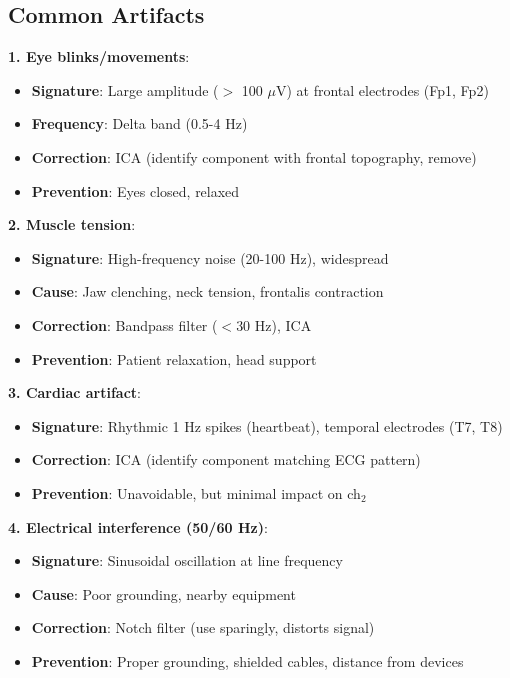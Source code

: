 \subsection{Common Artifacts}

\begin{theorem}\label{thm:artifacts}
\textbf{1. Eye blinks/movements}:
\begin{itemize}
\item \textbf{Signature}: Large amplitude ($>$ 100 $\mu$V) at frontal electrodes (Fp1, Fp2)
\item \textbf{Frequency}: Delta band (0.5-4 Hz)
\item \textbf{Correction}: ICA (identify component with frontal topography, remove)
\item \textbf{Prevention}: Eyes closed, relaxed
\end{itemize}

\textbf{2. Muscle tension}:
\begin{itemize}
\item \textbf{Signature}: High-frequency noise (20-100 Hz), widespread
\item \textbf{Cause}: Jaw clenching, neck tension, frontalis contraction
\item \textbf{Correction}: Bandpass filter ($< 30$ Hz), ICA
\item \textbf{Prevention}: Patient relaxation, head support
\end{itemize}

\textbf{3. Cardiac artifact}:
\begin{itemize}
\item \textbf{Signature}: Rhythmic 1 Hz spikes (heartbeat), temporal electrodes (T7, T8)
\item \textbf{Correction}: ICA (identify component matching ECG pattern)
\item \textbf{Prevention}: Unavoidable, but minimal impact on ch$_2$
\end{itemize}

\textbf{4. Electrical interference (50/60 Hz)}:
\begin{itemize}
\item \textbf{Signature}: Sinusoidal oscillation at line frequency
\item \textbf{Cause}: Poor grounding, nearby equipment
\item \textbf{Correction}: Notch filter (use sparingly, distorts signal)
\item \textbf{Prevention}: Proper grounding, shielded cables, distance from devices
\end{itemize}


\end{theorem}
